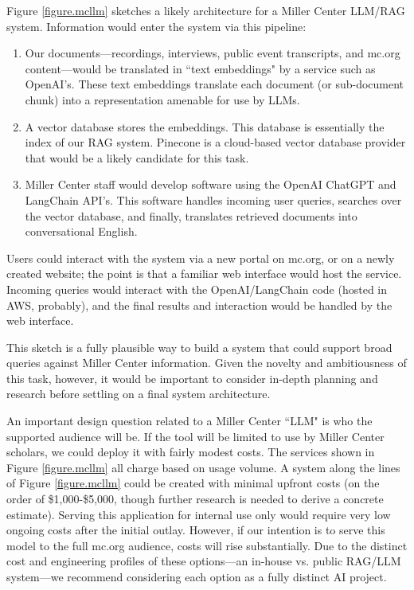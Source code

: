 \documentclass[12pt, oneside]{article}   	%
\begin{document}
Figure \ref{figure.mcllm} sketches a likely architecture for a Miller Center LLM/RAG system.  Information would enter the system via this pipeline:
\begin{enumerate}
\item Our documents---recordings, interviews, public event transcripts, and mc.org content---would be translated in ``text embeddings" by a service such as OpenAI's.  These text embeddings translate each document (or sub-document chunk) into a representation amenable for use by LLMs.
\item A vector database stores the embeddings.  This database is essentially the index of our RAG system.  Pinecone is a cloud-based vector database provider that would be a likely candidate for this task.
\item Miller Center staff would develop software using the OpenAI ChatGPT and LangChain API's.  This software handles incoming user queries, searches over the vector database, and finally, translates retrieved documents into conversational English.
\end{enumerate}
Users could interact with the system via a new portal on mc.org, or on a newly created website; the point is that a familiar web interface would host the service.  Incoming queries would interact with the OpenAI/LangChain code (hosted in AWS, probably), and the final results and interaction would be handled by the web interface.

This sketch is a fully plausible way to build a system that could support broad queries against Miller Center information.  Given the novelty and ambitiousness of this task, however, it would be important to consider in-depth planning and research before settling on a final system architecture.  

An important design question related to a Miller Center ``LLM" is who the supported audience will be.  If the tool will be limited to use by Miller Center scholars, we could deploy it with fairly modest costs.  The services shown in Figure \ref{figure.mcllm} all charge based on usage volume.  A system along the lines of Figure \ref{figure.mcllm} could be created with minimal upfront costs (on the order of \$1,000-\$5,000, though further research is needed to derive a concrete estimate).  Serving this application for internal use only would require very low ongoing costs after the initial outlay.  However, if our intention is to serve this model to the full mc.org audience, costs will rise substantially.   Due to the distinct cost and engineering profiles of these options---an in-house vs. public RAG/LLM system---we recommend considering each option as a fully distinct AI project.
\end{document}
